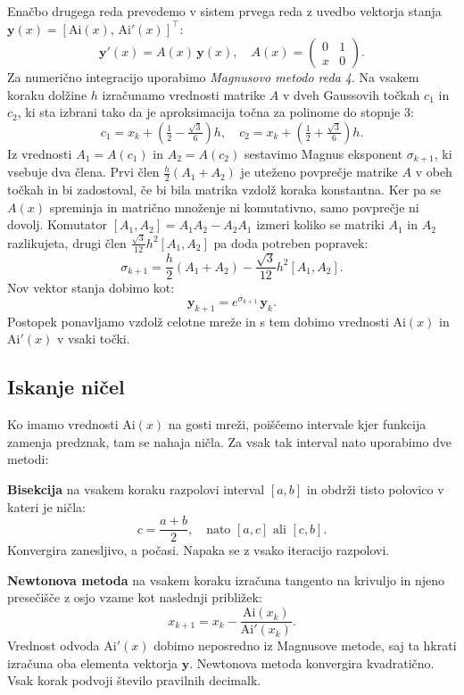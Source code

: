 \documentclass[a4paper, twocolumn]{article}
\begin{document}
Enačbo drugega reda prevedemo v sistem prvega reda z uvedbo vektorja stanja $\mathbf{y}(x) = [\mathrm{Ai}(x),\, \mathrm{Ai}'(x)]^\top$:
\[
\mathbf{y}'(x) = A(x)\,\mathbf{y}(x), \quad
A(x) = \begin{pmatrix} 0 & 1 \\ x & 0 \end{pmatrix}.
\]
Za numerično integracijo uporabimo \emph{Magnusovo metodo reda 4}. Na vsakem koraku dolžine $h$ izračunamo vrednosti matrike $A$ v dveh Gaussovih točkah $c_1$ in $c_2$, ki sta izbrani tako da je aproksimacija točna za polinome do stopnje 3:
\[
c_1 = x_k + \left(\tfrac{1}{2} - \tfrac{\sqrt{3}}{6}\right)h, \quad
c_2 = x_k + \left(\tfrac{1}{2} + \tfrac{\sqrt{3}}{6}\right)h.
\]
Iz vrednosti $A_1 = A(c_1)$ in $A_2 = A(c_2)$ sestavimo Magnus eksponent $\sigma_{k+1}$, ki vsebuje dva člena. Prvi člen $\frac{h}{2}(A_1 + A_2)$ je uteženo povprečje matrike $A$ v obeh točkah in bi zadostoval, če bi bila matrika vzdolž koraka konstantna. Ker pa se $A(x)$ spreminja in matrično množenje ni komutativno, samo povprečje ni dovolj. Komutator $[A_1, A_2] = A_1 A_2 - A_2 A_1$ izmeri koliko se matriki $A_1$ in $A_2$ razlikujeta, drugi člen $\frac{\sqrt{3}}{12}h^2[A_1, A_2]$ pa doda potreben popravek:
\[
\sigma_{k+1} = \frac{h}{2}(A_1 + A_2) - \frac{\sqrt{3}}{12}h^2[A_1, A_2].
\]
Nov vektor stanja dobimo kot:
\[
\mathbf{y}_{k+1} = e^{\sigma_{k+1}}\,\mathbf{y}_k.
\]
Postopek ponavljamo vzdolž celotne mreže in s tem dobimo vrednosti $\mathrm{Ai}(x)$ in $\mathrm{Ai}'(x)$ v vsaki točki.

\subsection{Iskanje ničel}

Ko imamo vrednosti $\mathrm{Ai}(x)$ na gosti mreži, poiščemo intervale kjer funkcija zamenja predznak, tam se nahaja ničla. Za vsak tak interval nato uporabimo dve metodi:

\textbf{Bisekcija} na vsakem koraku razpolovi interval $[a, b]$ in obdrži tisto polovico v kateri je ničla:
\[
c = \frac{a + b}{2}, \quad \text{nato } [a,c] \text{ ali } [c,b].
\]
Konvergira zanesljivo, a počasi. Napaka se z vsako iteracijo razpolovi.

\textbf{Newtonova metoda} na vsakem koraku izračuna tangento na krivuljo in njeno presečišče z osjo vzame kot naslednji približek:
\[
x_{k+1} = x_k - \frac{\mathrm{Ai}(x_k)}{\mathrm{Ai}'(x_k)}.
\]
Vrednost odvoda $\mathrm{Ai}'(x)$ dobimo neposredno iz Magnusove metode, saj ta hkrati izračuna oba elementa vektorja $\mathbf{y}$. Newtonova metoda konvergira kvadratično. Vsak korak podvoji število pravilnih decimalk.
\end{document}
